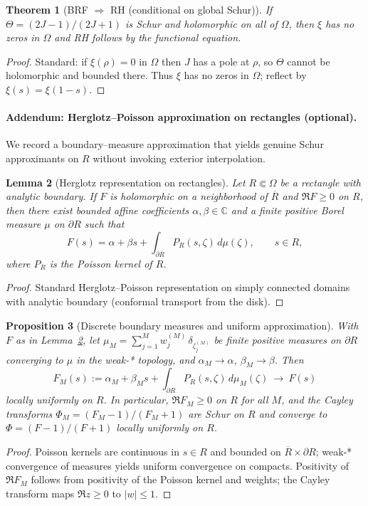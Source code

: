 \documentclass[11pt]{article}
\newtheorem{theorem}{Theorem}
\newtheorem{proposition}[theorem]{Proposition}
\newtheorem{lemma}[theorem]{Lemma}
\theoremstyle{definition}
\theoremstyle{remark}
\newcommand{\C}{\mathbb{C}}
\begin{document}
\begin{theorem}[BRF \(\Rightarrow\) RH (conditional on global Schur)]\label{thm:brf-rh-final}
If \(\Theta=(2J-1)/(2J+1)\) is Schur and holomorphic on all of \(\Omega\), then \(\xi\) has no zeros in \(\Omega\) and RH follows by the functional equation.
\end{theorem}
\begin{proof}
Standard: if \(\xi(\rho)=0\) in \(\Omega\) then \(J\) has a pole at \(\rho\), so \(\Theta\) cannot be holomorphic and bounded there. Thus \(\xi\) has no zeros in \(\Omega\); reflect by \(\xi(s)=\xi(1-s)\).
\end{proof}

\paragraph{Addendum: Herglotz--Poisson approximation on rectangles (optional).}
We record a boundary--measure approximation that yields genuine Schur approximants on \(R\) without invoking exterior interpolation.

\begin{lemma}[Herglotz representation on rectangles]\label{lem:herglotz-rect}
Let \(R\Subset\Omega\) be a rectangle with analytic boundary. If \(F\) is holomorphic on a neighborhood of \(\overline R\) and \(\Re F\ge 0\) on \(R\), then there exist bounded affine coefficients \(\alpha,\beta\in\C\) and a finite positive Borel measure \(\mu\) on \(\partial R\) such that
\[F(s)=\alpha+\beta s+\int_{\partial R} P_R(s,\zeta)\,d\mu(\zeta),\qquad s\in R,\]
where \(P_R\) is the Poisson kernel of \(R\).
\end{lemma}
\begin{proof}
Standard Herglotz--Poisson representation on simply connected domains with analytic boundary (conformal transport from the disk).
\end{proof}

\begin{proposition}[Discrete boundary measures and uniform approximation]\label{prop:discrete-Poisson}
With \(F\) as in Lemma~\ref{lem:herglotz-rect}, let \(\mu_M=\sum_{j=1}^{M} w_j^{(M)}\,\delta_{\zeta_j^{(M)}}\) be finite positive measures on \(\partial R\) converging to \(\mu\) in the weak-* topology, and \(\alpha_M\to\alpha\), \(\beta_M\to\beta\). Then
\[F_M(s):=\alpha_M+\beta_M s+\int_{\partial R} P_R(s,\zeta)\,d\mu_M(\zeta)\ \to\ F(s)\]
locally uniformly on \(R\). In particular, \(\Re F_M\ge 0\) on \(R\) for all \(M\), and the Cayley transforms \(\Phi_M=(F_M-1)/(F_M+1)\) are Schur on \(R\) and converge to \(\Phi=(F-1)/(F+1)\) locally uniformly on \(R\).
\end{proposition}
\begin{proof}
Poisson kernels are continuous in \(s\in R\) and bounded on \(\overline R\times\partial R\); weak-* convergence of measures yields uniform convergence on compacts. Positivity of \(\Re F_M\) follows from positivity of the Poisson kernel and weights; the Cayley transform maps \(\Re z\ge 0\) to \(|w|\le 1\).
\end{proof}
\end{document}
